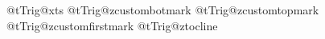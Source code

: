 %
%
%
%

\def\NotTriggerPoint#1{\x@\let\csname n@tTrig@#1\endcsname\@ne} %
\def\notlocation#1{\x@\let\csname n@tLocn@#1\endcsname\@ne} %
\def\IsTriggerPoint#1{\x@\let\csname n@tTrig@#1\endcsname\undefined} 
\let\attr@b\relax
\NotTriggerPoint{xts} %
\NotTriggerPoint{zcustombotmark}
\NotTriggerPoint{zcustomtopmark}
\NotTriggerPoint{zcustomfirstmark}
\NotTriggerPoint{ztocline}

\newif\ifsuppresstr@gger
\def\ch@ckislocation#1{\keeptriggerfalse\suppresstr@ggerfalse\ifcsname n@tLocn@#1\endcsname\keeptriggertrue\fi\ifcsname n@tTrig@#1\endcsname\suppresstr@ggertrue\fi}

\def\mst@nestyle#1{\trace{m}{mst@nestyle:#1 (\milestoneOp)}%
 \xdef\thismil@stone{\detokenize{#1}}%
 \catcode32=12 %
 \catcode13=12 %
 \futurelet\n@xt\domst@nestyle %
}

